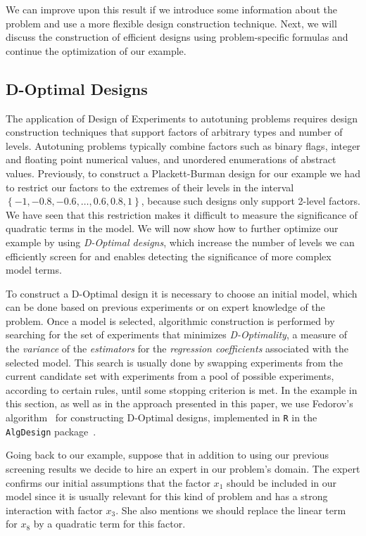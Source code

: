 \documentclass[conference]{IEEEtran}
\begin{document}
We can improve upon this result if we introduce some information about the
problem and use a more flexible design construction technique. Next, we will
discuss the construction of efficient designs using problem-specific formulas
and continue the optimization of our example.
\subsection{D-Optimal Designs}
\label{sec:org6dd2a01}
The application of Design of Experiments to autotuning problems requires design
construction techniques that support factors of arbitrary types and number of
levels. Autotuning problems typically combine factors such as binary flags,
integer and floating point numerical values, and unordered enumerations of
abstract values. Previously, to construct a Plackett-Burman design for our
example we had to restrict our factors to the extremes of their levels in the
interval \(\left\{-1, -0.8, -0.6,\dots,0.6, 0.8, 1\right\}\), because such designs
only support 2-level factors. We have seen that this restriction makes it
difficult to measure the significance of quadratic terms in the model. We will
now show how to further optimize our example by using \emph{D-Optimal designs}, which
increase the number of levels we can efficiently screen for and enables
detecting the significance of more complex model terms.

To construct a D-Optimal design it is necessary to choose an initial model,
which can be done based on previous experiments or on expert knowledge of the
problem. Once a model is selected, algorithmic construction is performed by
searching for the set of experiments that minimizes \emph{D-Optimality}, a measure of
the \emph{variance} of the \emph{estimators} for the \emph{regression coefficients} associated
with the selected model. This search is usually done by swapping experiments
from the current candidate set with experiments from a pool of possible
experiments, according to certain rules, until some stopping criterion is met.
In the example in this section, as well as in the approach presented in this
paper, we use Fedorov's algorithm~\cite{fedorov1972theory} for
constructing D-Optimal designs, implemented in \texttt{R} in the \texttt{AlgDesign}
package~\cite{wheeler2014algdesign}.

Going back to our example, suppose that in addition to using our previous
screening results we decide to hire an expert in our problem's domain. The
expert confirms our initial assumptions that the factor \(x_1\) should be included
in our model since it is usually relevant for this kind of problem and has a
strong interaction with factor \(x_3\). She also mentions we should replace
the linear term for \(x_8\) by a quadratic term for this factor.
\end{document}

